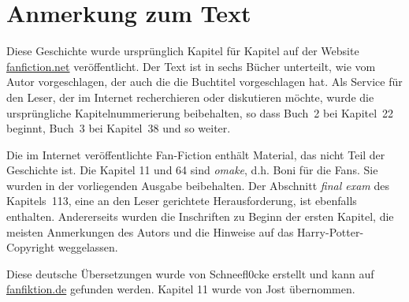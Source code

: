 \chapter{Anmerkung zum Text}
Diese Geschichte wurde ursprünglich Kapitel für Kapitel auf der Website
\href{https://www.fanfiction.net/s/5782108/1/Harry-Potter-and-the-Methods-of-Rationality}{\UrlFont
fanfiction.net} veröffentlicht. Der Text ist in sechs Bücher unterteilt, wie vom
Autor vorgeschlagen, der auch die die Buchtitel vorgeschlagen hat. Als Service
für den Leser, der im Internet recherchieren oder diskutieren möchte, wurde die
ursprüngliche Kapitelnummerierung beibehalten, so dass Buch~2 bei Kapitel~22
beginnt, Buch~3 bei Kapitel~38 und so weiter.

Die im Internet veröffentlichte Fan-Fiction enthält Material, das nicht Teil der
Geschichte ist. Die Kapitel 11 und 64 sind \emph{omake}, d.h. Boni für die Fans.
Sie wurden in der vorliegenden Ausgabe beibehalten. Der Abschnitt \emph{final
exam} des Kapitels~113, eine an den Leser gerichtete Herausforderung, ist
ebenfalls enthalten. Andererseits wurden die Inschriften zu Beginn der ersten
Kapitel, die meisten Anmerkungen des Autors und die Hinweise auf das
Harry-Potter-Copyright weggelassen.

Diese deutsche Übersetzungen wurde von Schneefl0cke erstellt und kann auf
\href{https://www.fanfiktion.de/s/60044849000ccc541aef297e/1/Ubersetzung-Harry-Potter-und-die-Methoden-des-rationalen-Denkens-Harry-Potter-and-the-methods-of-rationality}{\UrlFont
fanfiktion.de} gefunden werden. Kapitel 11 wurde von Jost übernommen.